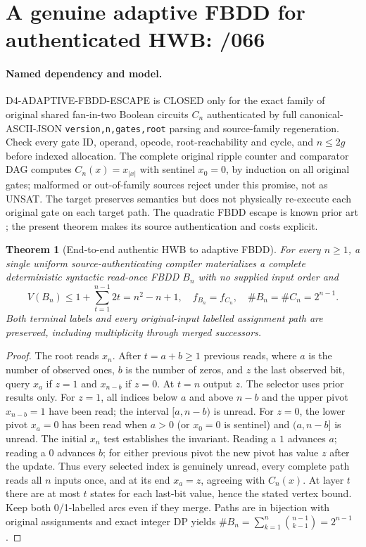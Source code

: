 \documentclass[11pt]{article}
\newtheorem{theorem}{Theorem}
\begin{document}
\section{A genuine adaptive FBDD for authenticated HWB: /066}
\paragraph{Named dependency and model.}
D4-ADAPTIVE-FBDD-ESCAPE is CLOSED only for the exact family of original
shared fan-in-two Boolean circuits $C_n$ authenticated by full
canonical-ASCII-JSON \texttt{version,n,gates,root} parsing and
source-family regeneration. Check every gate ID, operand, opcode,
root-reachability and cycle, and $n\le 2g$ before indexed allocation.
The complete original ripple counter and comparator DAG computes
$C_n(x)=x_{|x|}$ with sentinel $x_0=0$, by induction on all
original gates; malformed or out-of-family sources reject under
this promise, not as UNSAT. The target preserves semantics but does not
physically re-execute each original gate on each target path.
The quadratic FBDD escape is known prior art \cite{sieling1995,bollig1999};
the present theorem makes its source authentication and costs explicit.

\begin{theorem}[End-to-end authentic HWB to adaptive FBDD]
For every $n\ge1$, a single uniform source-authenticating compiler
materializes a complete deterministic syntactic read-once FBDD $B_n$
with no supplied input order and
\[
V(B_n)\le1+\sum_{t=1}^{n-1}2t=n^2-n+1,\quad
f_{B_n}=f_{C_n},\quad \#B_n=\#C_n=2^{n-1}.
\]
Both terminal labels and every original-input labelled assignment
path are preserved, including multiplicity through merged successors.
\end{theorem}
\begin{proof}
The root reads $x_n$. After $t=a+b\ge1$ previous reads, where
$a$ is the number of observed ones, $b$ is the number of zeros,
and $z$ the last observed bit, query $x_a$ if $z=1$ and $x_{n-b}$
if $z=0$. At $t=n$ output $z$. The selector uses prior results only.
For $z=1$, all indices below $a$ and above $n-b$ and the upper
pivot $x_{n-b}=1$ have been read; the interval $[a,n-b)$ is unread.
For $z=0$, the lower pivot $x_a=0$ has been read when $a>0$
(or $x_0=0$ is sentinel) and $(a,n-b]$ is unread. The initial
$x_n$ test establishes the invariant. Reading a $1$ advances $a$;
reading a $0$ advances $b$; for either previous pivot the
new pivot has value $z$ after the update. Thus every selected index
is genuinely unread, every complete path reads all $n$ inputs
once, and at its end $x_a=z$, agreeing with $C_n(x)$.
At layer $t$ there are at most $t$ states for each last-bit value,
hence the stated vertex bound. Keep both 0/1-labelled arcs even if
they merge. Paths are in bijection with original assignments and
exact integer DP yields
$\#B_n=\sum_{k=1}^n\binom{n-1}{k-1}=2^{n-1}$.
\end{proof}
\end{document}
